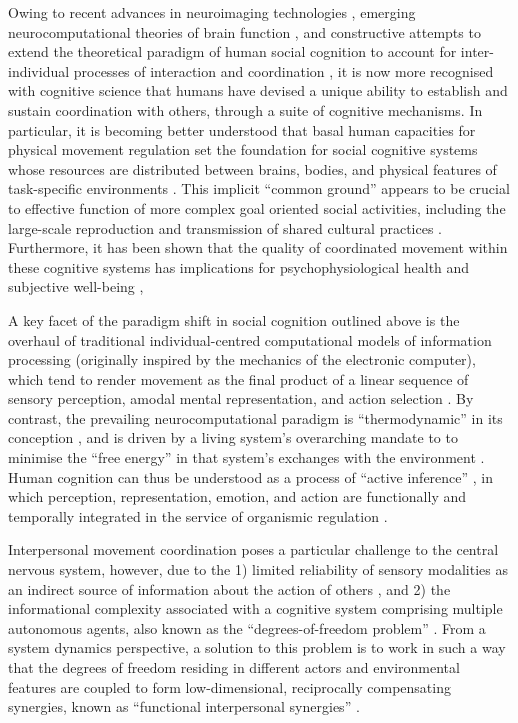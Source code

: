 \begin{CJK}{UTF8}{gbsn}
Owing to recent advances in neuroimaging technologies \citep{Frith2007}, emerging neurocomputational theories of brain function \citep{Yufik2013,Friston2010,Frith2010,Clark2013}, and constructive attempts to extend the theoretical paradigm of human social cognition to account for inter-individual processes of interaction and coordination \citep{Sebanz2006,Dale2014}, it is now more recognised with cognitive science that humans have devised a unique ability to establish and sustain coordination with others, through a suite of cognitive mechanisms.  In particular, it is becoming better understood that basal human capacities for physical movement regulation set the foundation for social cognitive systems whose resources are distributed between brains, bodies, and physical features of task-specific environments \citep{Hutchins2000,Kirsh2006,Semin2008,Semin2012,Coey2012}.  This implicit ``common ground'' appears to be crucial to effective function of more complex goal oriented social activities, including the large-scale reproduction and transmission of shared cultural practices \citep{Dunbar2012,Roepstorff2010,Claidiere2014,Launay2016}.  Furthermore, it has been shown that the quality of coordinated movement within these cognitive systems has implications for psychophysiological health and subjective well-being \citep{Wheatley2012},

A key facet of the paradigm shift in social cognition outlined above is the overhaul of traditional individual-centred computational models of information processing (originally inspired by the mechanics of the electronic computer), which tend to render movement as the final product of a linear sequence of sensory perception, amodal mental representation, and action selection \citep{Lewis2005}.  By contrast, the prevailing neurocomputational paradigm is ``thermodynamic'' in its conception \citep{Yufik2013}, and is driven by a living system's overarching mandate to to minimise the ``free energy'' in that system's exchanges with the environment \citep{Friston2010}.  Human cognition can thus be understood as a process of ``active inference'' \citep{Clark2013}, in which perception, representation, emotion, and action are functionally and temporally integrated in the service of organismic regulation \citep{Yufik2017}.

Interpersonal movement coordination poses a particular challenge to the central nervous system, however, due to the 1) limited reliability of sensory modalities as an indirect source of information about the action of others \citep{Frith2007}, and 2) the informational complexity associated with a cognitive system comprising multiple autonomous agents, also known as the ``degrees-of-freedom problem'' \citep[see ][]{Bernstein1967,Turvey1982,Turvey1990}.  From a system dynamics perspective, a solution to this problem is to work in such a way that the degrees of freedom residing in different actors and environmental features are coupled to form low-dimensional, reciprocally compensating synergies, known as ``functional interpersonal synergies'' \citep{Riley2011}.


\end{CJK}
